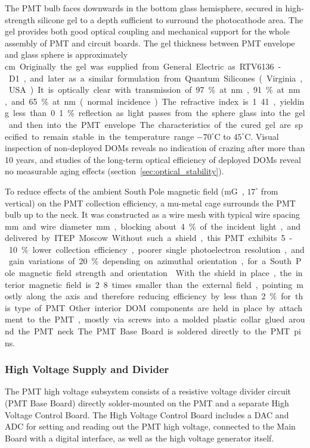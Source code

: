 The PMT bulb faces downwards in the bottom glass hemisphere, secured in high-strength 
silicone gel to a depth sufficient to surround the photocathode area.  
The gel provides both good optical coupling and mechanical support for the
whole assembly of PMT and circuit boards. The gel thickness between PMT
envelope and glass sphere is approximately \unit[1]cm.   
Originally the gel was supplied from General Electric as RTV6136-D1,
and later as a similar formulation from Quantum Silicones (Virginia, USA).  
It is optically clear with transmission of 97\% at \unit[400]nm, 91\% at \unit[340]nm, and 65\% at \unit[300]nm
(normal incidence).  The refractive index is 1.41, yielding less than 0.1\% reflection as light
passes from the sphere glass into the gel and then into the PMT envelope.
The characteristics of the cured gel are specified to remain stable in the
temperature range $-70^\circ$C to $45^\circ$C.  Visual inspection of
non-deployed DOMs reveals no indication of crazing after more than 10
years, and studies of the long-term optical efficiency of deployed DOMs
reveal no measurable aging effects (section~\ref{sec:optical_stability}).  

To reduce effects of the ambient South Pole magnetic field (\unit[550]mG, $17^\circ$
from vertical) on the PMT collection efficiency, a mu-metal cage surrounds the PMT bulb up to
the neck.  It was constructed as a wire mesh with typical wire spacing \unit[66]mm and
wire diameter \unit[1]mm, blocking about 4\% of the incident light,
and delivered by ITEP Moscow.
Without such a shield, this PMT exhibits 5-10\% lower
collection efficiency, poorer single photoelectron resolution, and gain variations of 20\% depending on 
azimuthal orientation, for a South Pole magnetic field strength and orientation~\cite{calvo}.
With the shield in place, the interior magnetic field is 2.8 times
smaller than the external field, pointing mostly along the axis and therefore reducing efficiency by
less than 2\% for this type of PMT.

Other interior DOM components are held in place by attachment to the PMT, mostly via screws into
a molded plastic collar glued around the PMT neck.  The PMT Base Board is
soldered directly to the PMT pins.

\subsubsection{\label{sec:hv}High Voltage Supply and Divider}

The PMT high voltage subsystem consists of a resistive 
voltage divider circuit (PMT Base Board) directly
solder-mounted on the PMT and a separate High Voltage Control Board. 
The High Voltage Control Board includes a DAC and ADC for setting and reading out the PMT high voltage,
connected to the Main Board with a digital interface, as well as the high
voltage generator itself.

